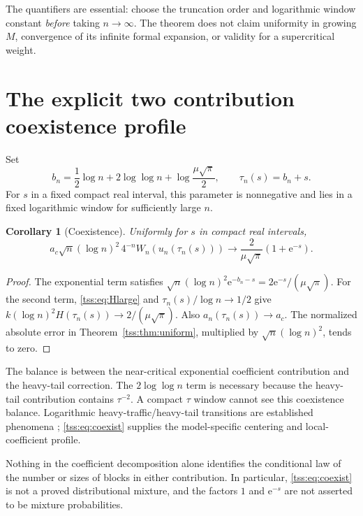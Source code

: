 \documentclass[11pt]{article}
\newtheorem{corollary}[theorem]{Corollary}
\theoremstyle{remark}\newtheorem{remark}[theorem]{Remark}
\theoremstyle{definition}\newtheorem{definition}[theorem]{Definition}
\newcommand{\e}{\mathrm e}
\begin{document}
The quantifiers are essential: choose the truncation order and logarithmic window constant \emph{before} taking $n\to\infty$. The theorem does not claim uniformity in growing $M$, convergence of its infinite formal expansion, or validity for a supercritical weight.

\section{The explicit two contribution coexistence profile}
\label{tss:sec:coexist}
Set
\begin{equation}\label{tss:eq:center}
b_n=\frac12\log n+2\log\log n+\log\frac{\mu\sqrt\pi}{2},
\qquad \tau_n(s)=b_n+s.
\end{equation}
For $s$ in a fixed compact real interval, this parameter is nonnegative and lies in a fixed logarithmic window for sufficiently large $n$.

\begin{corollary}[Coexistence]\label{tss:cor:coexist}
Uniformly for $s$ in compact real intervals,
\begin{equation}\label{tss:eq:coexist}
a_c\sqrt n(\log n)^2\,4^{-n}W_n(u_n(\tau_n(s)))
 \longrightarrow \frac2{\mu\sqrt\pi}(1+\e^{-s}).
\end{equation}
\end{corollary}
\begin{proof}
The exponential term satisfies
$\sqrt n(\log n)^2\e^{-b_n-s}=2\e^{-s}/(\mu\sqrt\pi)$.
For the second term, \eqref{tss:eq:Hlarge} and $\tau_n(s)/\log n\to1/2$ give
$k(\log n)^2H(\tau_n(s))\to2/(\mu\sqrt\pi)$.
Also $a_n(\tau_n(s))\to a_c$. The normalized absolute error in Theorem~\ref{tss:thm:uniform}, multiplied by $\sqrt n(\log n)^2$, tends to zero.
\end{proof}

The balance is between the near-critical exponential coefficient contribution and the heavy-tail correction. The $2\log\log n$ term is necessary because the heavy-tail contribution contains $\tau^{-2}$. A compact $\tau$ window cannot see this coexistence balance. Logarithmic heavy-traffic/heavy-tail transitions are established phenomena \cite{OCBG}; \eqref{tss:eq:coexist} supplies the model-specific centering and local-coefficient profile.

Nothing in the coefficient decomposition alone identifies the conditional law of the number or sizes of blocks in either contribution. In particular, \eqref{tss:eq:coexist} is not a proved distributional mixture, and the factors $1$ and $\e^{-s}$ are not asserted to be mixture probabilities.
\end{document}
